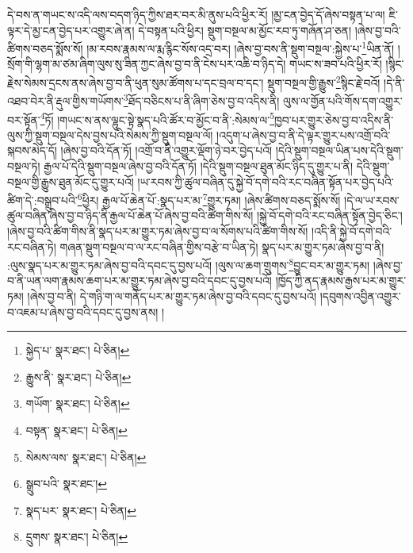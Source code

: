 དེ་བས་ན་གཡང་ས་འདི་ལས་བདག་ཉིད་ཀྱིས་ཐར་བར་མི་ནུས་པའི་ཕྱིར་རོ། །མྱ་ངན་བྱེད་དོ་ཞེས་བསྟན་པ་ལ། ཇི་ལྟར་དེ་མྱ་ངན་བྱེད་པར་འགྱུར་ཞེ་ན། དེ་བསྟན་པའི་ཕྱིར། སྡུག་བསྔལ་མ་མྱོང་རབ་ཏུ་གཞོན་ཤ་ཅན། །ཞེས་བྱ་བའི་ཚིགས་བཅད་སྨོས་སོ། །མ་རབས་རྣམས་ལ་རྨ་རྙིང་སོས་འདྲ་བར། །ཞེས་བྱ་བས་ནི་སྡུག་བསྔལ་:སྐྱེས་པ་\footnote{སྐྱེད་པ་  སྣར་ཐང་།  པེ་ཅིན། }ཡིན་ནོ། །སྲོག་གི་ལྷག་མ་ཙམ་ཞིག་ལུས་སུ་ཟིན་ཀྱང་ཞེས་བྱ་བ་ནི་ངེས་པར་འཆི་བ་ཉིད་དེ། གཡང་ས་ཟབ་པའི་ཕྱིར་རོ། །སྙིང་རྗེས་སེམས་དྲངས་ནས་ཞེས་བྱ་བ་ནི་ཕུན་སུམ་ཚོགས་པ་དང་བྲལ་བ་དང་། སྡུག་བསྔལ་གྱི་རྒྱུས་\footnote{རྒྱུས་ནི་  སྣར་ཐང་།  པེ་ཅིན། }སྙིང་རྗེ་བའོ། །དེ་ནི་འཐབ་བེར་ནི་རྡུལ་གྱིས་གཡོགས་\footnote{གཡོག་  སྣར་ཐང་།  པེ་ཅིན། }ཐོད་བཅིངས་པ་ནི་ཞིག་ཅེས་བྱ་བ་འདིས་ནི། ལུས་ལ་གྱོན་པའི་གོས་དག་འགྱུར་བར་སྟོན་\footnote{བསྟན་  སྣར་ཐང་།  པེ་ཅིན། }ཏོ། །གཡང་ས་ནས་ལྷུང་སྟེ་སྣད་པའི་ཚོར་བ་མྱོང་བ་ནི་:སེམས་ལ་\footnote{སེམས་ལས་  སྣར་ཐང་།  པེ་ཅིན། }ཁྱབ་པར་གྱུར་ཅེས་བྱ་བ་འདིས་ནི་ལུས་ཀྱི་སྡུག་བསྔལ་དེས་བྱས་པའི་སེམས་ཀྱི་སྡུག་བསྔལ་ལོ། །འདུག་པ་ཞེས་བྱ་བ་ནི་དེ་ལྟར་གྱུར་པས་འགྲོ་བའི་སྐབས་མེད་དོ། །ཞེས་བྱ་བའི་དོན་ཏོ། །འགྲོ་བ་ནི་འགྱུར་ལྡོག་ཉེ་བར་བྱེད་པའོ། །དེའི་སྡུག་བསྔལ་ཡིན་པས་དེའི་སྡུག་བསྔལ་ཏེ། རྒྱལ་པོ་དེའི་སྡུག་བསྔལ་ཞེས་བྱ་བའི་དོན་ཏོ། །དེའི་སྡུག་བསྔལ་ཐུན་མོང་ཉིད་དུ་གྱུར་པ་ནི། དེའི་སྡུག་བསྔལ་གྱི་རྒྱུས་ཐུན་མོང་དུ་གྱུར་པའོ། །ཡ་རབས་ཀྱི་ཚུལ་བཞིན་དུ་སྐྱེ་བོ་དགེ་བའི་རང་བཞིན་སྟོན་པར་བྱེད་པའི་ཚིག་དེ་:བསྒྲུབ་པའི་\footnote{སྒྲུབ་པའི་  སྣར་ཐང་། }ཕྱིར། རྒྱལ་པོ་ཆེན་པོ་:སྣད་པར་མ་\footnote{སྣད་པར་  སྣར་ཐང་།  པེ་ཅིན། }གྱུར་ཏམ། །ཞེས་ཚིགས་བཅད་སྨོས་སོ། །དེ་ལ་ཡ་རབས་ཚུལ་བཞིན་ཞེས་བྱ་བ་ཉིད་ནི་རྒྱལ་པོ་ཆེན་པོ་ཞེས་བྱ་བའི་ཚིག་གིས་སོ། །སྐྱེ་བོ་དགེ་བའི་རང་བཞིན་སྟོན་བྱེད་ཅིང་། །ཞེས་བྱ་བའི་ཚིག་གིས་ནི་སྣད་པར་མ་གྱུར་ཏམ་ཞེས་བྱ་བ་ལ་སོགས་པའི་ཚིག་གིས་སོ། །འདི་ནི་སྐྱེ་བོ་དགེ་བའི་རང་བཞིན་ཏེ། གཞན་སྡུག་བསྔལ་བ་ལ་རང་བཞིན་གྱིས་བརྩེ་བ་ཡིན་ཏེ། སྣད་པར་མ་གྱུར་ཏམ་ཞེས་བྱ་བ་ནི། :ལུས་སྣད་པར་མ་གྱུར་ཏམ་ཞེས་བྱ་བའི་དབང་དུ་བྱས་པའོ། །ལུས་ལ་ཆག་གྲུགས་\footnote{དྲུགས་  སྣར་ཐང་།  པེ་ཅིན། }བྱུང་བར་མ་གྱུར་ཏམ། །ཞེས་བྱ་བ་ནི་ཡན་ལག་རྣམས་ཆག་པར་མ་གྱུར་ཏམ་ཞེས་བྱ་བའི་དབང་དུ་བྱས་པའོ། །ཁྱོད་ཀྱི་ནད་རྣམས་རྒྱས་པར་མ་གྱུར་ཏམ། །ཞེས་བྱ་བ་ནི། དེ་གཉི་ག་ལ་གནོད་པར་མ་གྱུར་ཏམ་ཞེས་བྱ་བའི་དབང་དུ་བྱས་པའོ། །དབུགས་འབྱིན་འགྱུར་བ་འཇམ་པ་ཞེས་བྱ་བའི་དབང་དུ་བྱས་ནས། །
